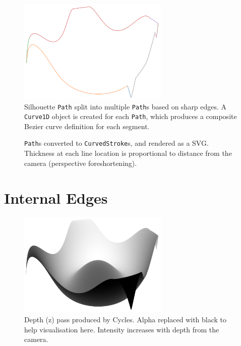 \begin{figure}[h!]
	\centering
	\includegraphics[height=5cm]{images/sil_split_paths.png}
	\caption{Silhouette \texttt{Path} split into multiple \texttt{Path}s based on sharp edges. A \texttt{Curve1D} object is created for each \texttt{Path}, which produces a composite Bezier curve definition for each segment.}\label{sil_split_paths}
\end{figure}

\begin{figure}[h!]
	\centering
	
	\caption{\texttt{Path}s converted to \texttt{CurvedStroke}s, and rendered as a SVG. Thickness at each line location is proportional to distance from the camera (perspective foreshortening).}\label{sil_obj}
\end{figure}

\newpage

\FloatBarrier
\section{Internal Edges}\label{impl_internal}
\begin{figure}[h!]
	\centering
	\includegraphics[height=5cm]{images/int_depth.png}
	\caption{Depth (z) pass produced by Cycles. Alpha replaced with black to help visualisation here. Intensity increases with depth from the camera.}\label{int_depth}
\end{figure}

